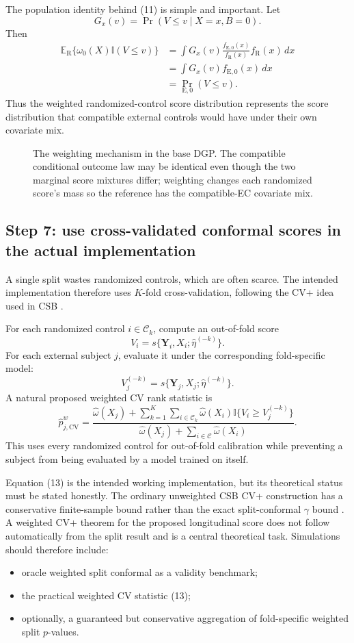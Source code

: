 \documentclass[11pt]{article}
\newcommand{\R}{\mathrm{R}}
\newcommand{\E}{\mathrm{E}}
\newcommand{\Exp}{\mathbb{E}}
\newcommand{\ind}{\mathbb{I}}
\newcommand{\fullfig}[1]{\resizebox{\linewidth}{!}{}}
\begin{document}
The population identity behind (11) is simple and important. Let
\[
G_x(v)=\Pr(V\le v\mid X=x,B=0).
\]
Then
\[
\begin{aligned}
\Exp_{\R}\{\omega_0(X)\ind(V\le v)\}
&=\int G_x(v)\frac{f_{\E,0}(x)}{f_{\R}(x)}f_{\R}(x)\,dx\\
&=\int G_x(v)f_{\E,0}(x)\,dx\\
&=\Pr_{\E,0}(V\le v).
\end{aligned}
\tag{12}
\]
Thus the weighted randomized-control score distribution represents the score distribution that compatible external controls would have under their own covariate mix.

\begin{figure}[!ht]
\centering
\fullfig{covariate_shift.tex}
\caption{The weighting mechanism in the base DGP. The compatible conditional outcome law may be identical even though the two marginal score mixtures differ; weighting changes each randomized score's mass so the reference has the compatible-EC covariate mix.}
\label{fig:covariate-shift}
\end{figure}

\subsection{Step 7: use cross-validated conformal scores in the actual implementation}

A single split wastes randomized controls, which are often scarce. The intended implementation therefore uses $K$-fold cross-validation, following the CV+ idea used in CSB \citep{zhu2025csb,barber2021jackknife}.

For each randomized control $i\in\mathcal C_k$, compute an out-of-fold score
\[
V_i
=s\{\bm Y_i,X_i;\widehat\eta^{(-k)}\}.
\]
For each external subject $j$, evaluate it under the corresponding fold-specific model:
\[
V_j^{(-k)}
=s\{\bm Y_j,X_j;\widehat\eta^{(-k)}\}.
\]
A natural proposed weighted CV rank statistic is
\[
\widehat p_{j,\mathrm{CV}}^{w}
=
\frac{
\widehat\omega(X_j)
+
\sum_{k=1}^{K}\sum_{i\in\mathcal C_k}
\widehat\omega(X_i)
\ind\{V_i\ge V_j^{(-k)}\}
}
{
\widehat\omega(X_j)
+
\sum_{i\in\mathcal C}\widehat\omega(X_i)
}.
\tag{13}
\]
This uses every randomized control for out-of-fold calibration while preventing a subject from being evaluated by a model trained on itself.

Equation (13) is the intended working implementation, but its theoretical status must be stated honestly. The ordinary unweighted CSB CV+ construction has a conservative finite-sample bound rather than the exact split-conformal $\gamma$ bound \citep{zhu2025csb}. A weighted CV+ theorem for the proposed longitudinal score does not follow automatically from the split result and is a central theoretical task. Simulations should therefore include:
\begin{itemize}
    \item oracle weighted split conformal as a validity benchmark;
    \item the practical weighted CV statistic (13);
    \item optionally, a guaranteed but conservative aggregation of fold-specific weighted split $p$-values.
\end{itemize}
\end{document}
